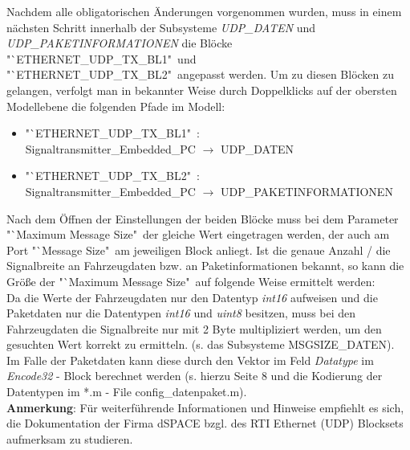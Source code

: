 \documentclass[fontsize = 12pt, paper = a4]{scrreprt}
\begin{document}
\newpage

Nachdem alle obligatorischen Änderungen vorgenommen wurden, muss in einem nächsten Schritt innerhalb der Subsysteme \textit{UDP\_DATEN} und \textit{UDP\_PAKETINFORMATIONEN} die Blöcke "`ETHERNET\_UDP\_TX\_BL1"\ und "`ETHERNET\_UDP\_TX\_BL2"\ angepasst werden. Um zu diesen Blöcken zu gelangen, verfolgt man in bekannter Weise durch Doppelklicks auf der obersten Modellebene die folgenden Pfade im Modell: 

\begin{itemize}[leftmargin=*]

\item "`ETHERNET\_UDP\_TX\_BL1"\ : \\ Signaltransmitter\_Embedded\_PC $\rightarrow$ UDP\_DATEN 

\item "`ETHERNET\_UDP\_TX\_BL2"\ : \\ Signaltransmitter\_Embedded\_PC $\rightarrow$ UDP\_PAKETINFORMATIONEN

\end{itemize}

Nach dem Öffnen der Einstellungen der beiden Blöcke muss bei dem Parameter "`Maximum Message Size"\ der gleiche Wert eingetragen werden, der auch am Port "`Message Size"\ am jeweiligen Block anliegt. Ist die genaue Anzahl / die Signalbreite an Fahrzeugdaten bzw. an Paketinformationen bekannt, so kann die Größe der "`Maximum Message Size"\ auf folgende Weise ermittelt werden: \\


Da die Werte der Fahrzeugdaten nur den Datentyp \textit{int16}  aufweisen und die Paketdaten nur die Datentypen \textit{int16}  und \textit{uint8} besitzen, muss bei den Fahrzeugdaten die  Signalbreite nur mit 2 Byte multipliziert werden, um den gesuchten Wert korrekt zu ermitteln. (s. das Subsysteme MSGSIZE\_DATEN). Im Falle der Paketdaten kann diese durch den Vektor im Feld \textit{Datatype} im \textit{Encode32} - Block berechnet werden (s. hierzu Seite 8 und die Kodierung der Datentypen im *.m - File config\_datenpaket.m). \\  

\textbf{Anmerkung}: Für weiterführende Informationen und Hinweise empfiehlt es sich, die Dokumentation der Firma dSPACE bzgl. des RTI Ethernet (UDP) Blocksets aufmerksam zu studieren. \\

\newpage




\end{document}
